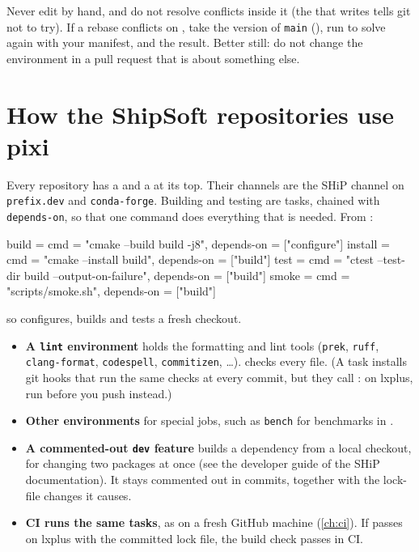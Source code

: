 \begin{pitfall}
Never edit  by hand, and do not resolve conflicts inside it
(the  that  writes tells git not to
try). If a rebase conflicts on , take the version of
\texttt{main} (), run
 to solve again with your manifest, and  the
result. Better still: do not change the environment in a pull request that is
about something else.
\end{pitfall}

\section{How the ShipSoft repositories use pixi}

Every repository has a  and a  at its top.
Their channels are the SHiP channel on \texttt{prefix.dev} and
\texttt{conda-forge}.
Building and testing are tasks, chained with \texttt{depends-on}, so that one
command does everything that is needed. From :
\begin{tomlcode}
build = { cmd = "cmake --build build -j8", depends-on = ["configure"] }
install = { cmd = "cmake --install build", depends-on = ["build"] }
test = { cmd = "ctest --test-dir build --output-on-failure", depends-on = ["build"] }
smoke = { cmd = "scripts/smoke.sh", depends-on = ["build"] }
\end{tomlcode}
so  configures, builds and tests a fresh checkout.

\begin{itemize}
  \item \textbf{A \texttt{lint} environment} holds the formatting and lint
    tools (\texttt{prek}, \texttt{ruff}, \texttt{clang-format},
    \texttt{codespell}, \texttt{commitizen}, \ldots).
     checks every file. (A task 
    installs git hooks that run the same checks at every commit, but they
    call : on lxplus, run  before you push
    instead.)
  \item \textbf{Other environments} for special jobs, such as \texttt{bench}
    for benchmarks in .
  \item \textbf{A commented-out \texttt{dev} feature} builds a dependency
    from a local checkout, for changing two packages at once (see the
    developer guide of the SHiP documentation). It stays commented out in
    commits, together with the lock-file changes it causes.
  \item \textbf{CI runs the same tasks}, as 
    on a fresh GitHub machine (\cref{ch:ci}). If  passes
    on lxplus with the committed lock file, the build check passes in CI.
\end{itemize}

